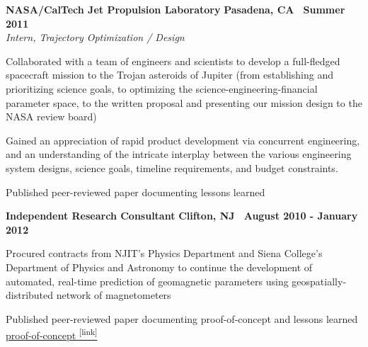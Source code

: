 \documentclass[10pt]{article}
\newcommand{\leftandright}[2]{\noindent\textbf{#1}\hfill
\textbf{#2}}
\begin{document}
\leftandright{NASA/CalTech Jet Propulsion Laboratory}{Pasadena, CA \textbullet\, Summer 2011}\\  
\vspace{-0.8em}
\textit{Intern, Trajectory Optimization / Design} 
\begin{itemize*}
  \item
    Collaborated with a team of engineers and scientists to develop a full-fledged spacecraft mission to
    the Trojan asteroids of Jupiter
    (from %
    establishing and prioritizing science goals, to optimizing the science-engineering-financial
    parameter space, to the written proposal and presenting our mission design to the NASA review
    board)
  \item 
    Gained an appreciation of rapid product development via concurrent
    engineering, and an understanding of the intricate interplay between the
    various engineering system designs, science goals, timeline
    requirements, and budget constraints.
  \item Published peer-reviewed paper documenting lessons learned
\end{itemize*}
   
\leftandright{Independent Research Consultant}{Clifton, NJ \textbullet\, 
August 2010 - January 2012} \par
\vspace{-0.8em}
\begin{itemize*}
  \item Procured contracts from NJIT's Physics Department and Siena
    College's Department of Physics and Astronomy to 
    continue the development of automated, real-time prediction of geomagnetic parameters
    using geospatially-distributed network of magnetometers
  \item Published peer-reviewed paper documenting proof-of-concept and 
    lessons learned
    \href{http://onlinelibrary.wiley.com/doi/10.1029/2011SW000688/full}
    {proof-of-concept \textsuperscript{\tiny{[link]}}}
\end{itemize*}   
\end{document}
